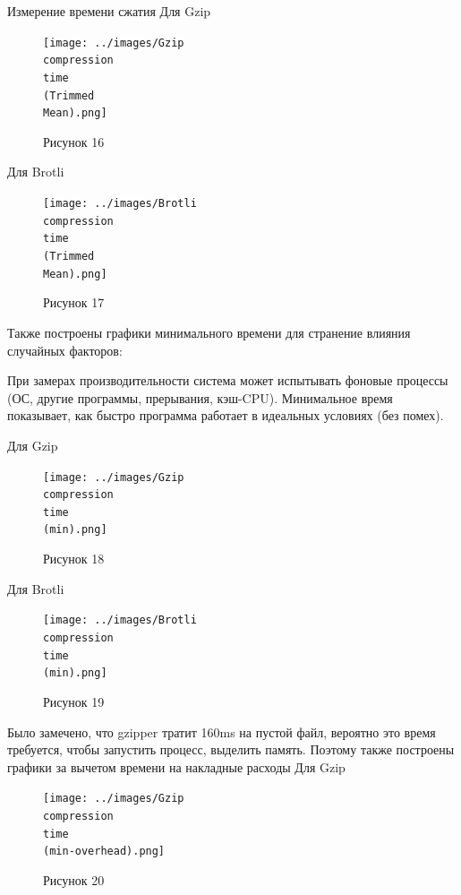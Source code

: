 \documentclass[12pt]{article}
\begin{document}
    Измерение времени сжатия
    Для Gzip
    \begin{figure}[h!]
        \centering
        \texttt{[image: ../images/Gzip\\ compression\\ time\\ (Trimmed\\ Mean).png]}
        \caption{Рисунок 16}
    \end{figure}

    Для Brotli
    \begin{figure}[h!]
        \centering
        \texttt{[image: ../images/Brotli\\ compression\\ time\\ (Trimmed\\ Mean).png]}
        \caption{Рисунок 17}
    \end{figure}

    Также построены графики минимального времени для странение влияния случайных факторов:

    При замерах производительности система может испытывать фоновые процессы (ОС, другие программы, прерывания, кэш-CPU).
    Минимальное время показывает, как быстро программа работает в идеальных условиях (без помех).

    Для Gzip
    \begin{figure}[h!]
        \centering
        \texttt{[image: ../images/Gzip\\ compression\\ time\\ (min).png]}
        \caption{Рисунок 18}
    \end{figure}

    Для Brotli
    \begin{figure}[h!]
        \centering
        \texttt{[image: ../images/Brotli\\ compression\\ time\\ (min).png]}
        \caption{Рисунок 19}
    \end{figure}

    Было замечено, что gzipper тратит 160ms на пустой файл, вероятно это время требуется, чтобы запустить процесс, выделить память. Поэтому также построены графики за вычетом времени на накладные расходы
    Для Gzip
    \begin{figure}[h!]
        \centering
        \texttt{[image: ../images/Gzip\\ compression\\ time\\ (min-overhead).png]}
        \caption{Рисунок 20}
    \end{figure}
\end{document}

